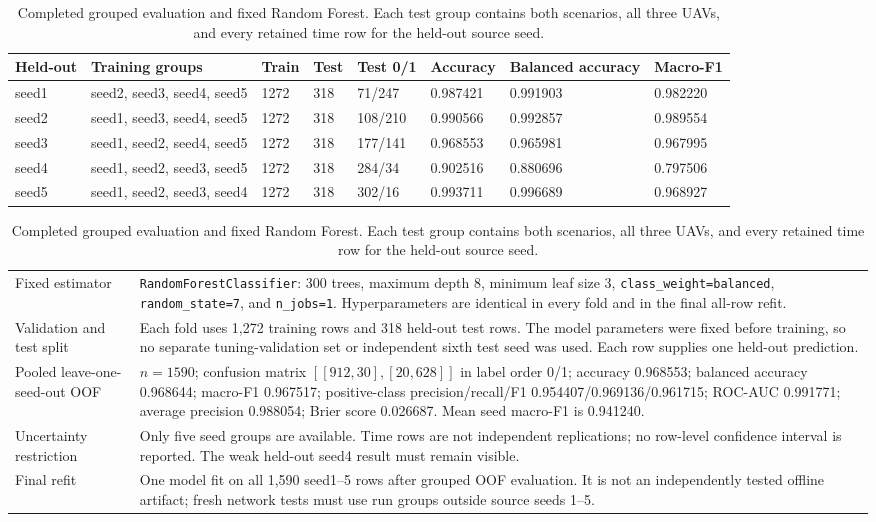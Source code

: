 \begin{table}[t]
\centering
\footnotesize
\caption{Completed grouped evaluation and fixed Random Forest.  Each test group contains both scenarios, all three UAVs, and every retained time row for the held-out source seed.}
\label{tab:audited_group_splits}
\begin{tabular}{p{} p{} p{} p{} p{} p{} p{} p{}}
\hline
Held-out & Training groups & Train & Test & Test 0/1 & Accuracy & Balanced accuracy & Macro-F1 \\
\hline
seed1 & seed2, seed3, seed4, seed5 & 1272 & 318 & 71/247 & 0.987421 & 0.991903 & 0.982220 \\
seed2 & seed1, seed3, seed4, seed5 & 1272 & 318 & 108/210 & 0.990566 & 0.992857 & 0.989554 \\
seed3 & seed1, seed2, seed4, seed5 & 1272 & 318 & 177/141 & 0.968553 & 0.965981 & 0.967995 \\
seed4 & seed1, seed2, seed3, seed5 & 1272 & 318 & 284/34 & 0.902516 & 0.880696 & 0.797506 \\
seed5 & seed1, seed2, seed3, seed4 & 1272 & 318 & 302/16 & 0.993711 & 0.996689 & 0.968927 \\
\hline
\end{tabular}

\vspace{4pt}
\begin{tabular}{p{} p{}}
\hline
Fixed estimator & \texttt{Random\allowbreak Forest\allowbreak Classifier}: 300 trees, maximum depth 8, minimum leaf size 3, \texttt{class\_\allowbreak weight=balanced}, \texttt{random\_\allowbreak state=7}, and \texttt{n\_jobs=1}.  Hyperparameters are identical in every fold and in the final all-row refit. \\
Validation and test split & Each fold uses 1,272 training rows and 318 held-out test rows. The model parameters were fixed before training, so no separate tuning-validation set or independent sixth test seed was used. Each row supplies one held-out prediction. \\
Pooled leave-one-seed-out OOF & $n=1590$; confusion matrix $[[912,30],[20,628]]$ in label order 0/1; accuracy 0.968553; balanced accuracy 0.968644; macro-F1 0.967517; positive-class precision/recall/F1 0.954407/0.969136/0.961715; ROC-AUC 0.991771; average precision 0.988054; Brier score 0.026687.  Mean seed macro-F1 is 0.941240. \\
Uncertainty restriction & Only five seed groups are available.  Time rows are not independent replications; no row-level confidence interval is reported.  The weak held-out seed4 result must remain visible. \\
Final refit & One model fit on all 1,590 seed1--5 rows after grouped OOF evaluation.  It is not an independently tested offline artifact; fresh network tests must use run groups outside source seeds 1--5. \\
\hline
\end{tabular}
\end{table}


